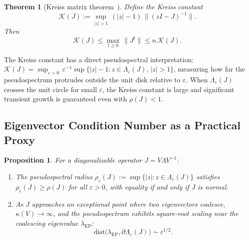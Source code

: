 \documentclass[aps,prresearch,twocolumn,superscriptaddress,longbibliography]{revtex4-2}
\newtheorem{proposition}{Proposition}
\newtheorem{theorem}{Theorem}
\newcommand{\Kc}{\mathcal{K}}
\begin{document}
\begin{theorem}[Kreiss matrix theorem~\cite{kreiss1962,trefethen2005}]
\label{thm:kreiss}
Define the Kreiss constant
\begin{equation}
\Kc(J) := \sup_{|z|>1}\,(|z|-1)\,\|(zI-J)^{-1}\|.
\label{eq:kreiss}
\end{equation}
Then
\begin{equation}
\Kc(J) \leq \max_{t\geq 0}\,\|J^t\| \leq n\,\Kc(J).
\label{eq:kreiss_bound}
\end{equation}
\end{theorem}

The Kreiss constant has a direct pseudospectral interpretation:
$\Kc(J) = \sup_{\varepsilon>0}\,\varepsilon^{-1}\sup\{|z|-1 :
z\in\Lambda_\varepsilon(J),\,|z|>1\}$,
measuring how far the pseudospectrum protrudes outside the unit disk
relative to $\varepsilon$.
When $\Lambda_\varepsilon(J)$ crosses the unit circle for small $\varepsilon$,
the Kreiss constant is large and significant transient growth is
guaranteed even with $\rho(J) < 1$.

\subsection{Eigenvector Condition Number as a Practical Proxy}

\begin{proposition}
\label{prop:proxy}
For a diagonalizable operator $J = V\Lambda V^{-1}$:
\begin{enumerate}
\item[(i)] The pseudospectral radius $\rho_\varepsilon(J) :=
\sup\{|z| : z\in\Lambda_\varepsilon(J)\}$ satisfies
$\rho_\varepsilon(J) \geq \rho(J)$ for all $\varepsilon > 0$,
with equality if and only if $J$ is normal.
\item[(ii)] As $J$ approaches an exceptional point where two eigenvectors
coalesce, $\kappa(V)\to\infty$, and the pseudospectrum exhibits
square-root scaling near the coalescing eigenvalue $\lambda_{\mathrm{EP}}$:
\begin{equation}
\mathrm{dist}\bigl(\lambda_{\mathrm{EP}},\partial\Lambda_\varepsilon(J)\bigr)
  \sim \varepsilon^{1/2}.
\label{eq:ep_scaling}
\end{equation}
\end{enumerate}
\end{proposition}
\end{document}
